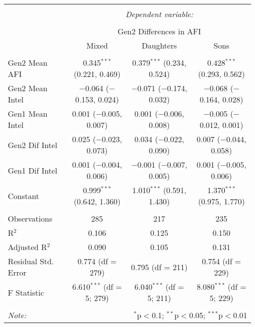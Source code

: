
\begingroup 
\small 
\begin{tabular}{@{\extracolsep{1pt}}lccc} 
\\[-1.8ex]\hline 
\hline \\[-1.8ex] 
 & \multicolumn{3}{c}{\textit{Dependent variable:}} \\ 
\cline{2-4} 
\\[-1.8ex] & \multicolumn{3}{c}{Gen2 Differences in AFI} \\ 
 & Mixed & Daughters & Sons \\ 
\hline \\[-1.8ex] 
 Gen2 Mean AFI & 0.345$^{***}$ (0.221, 0.469) & 0.379$^{***}$ (0.234, 0.524) & 0.428$^{***}$ (0.293, 0.562) \\ 
  Gen2 Mean Intel & $-$0.064 ($-$0.153, 0.024) & $-$0.071 ($-$0.174, 0.032) & $-$0.068 ($-$0.164, 0.028) \\ 
  Gen1 Mean Intel & 0.001 ($-$0.005, 0.007) & 0.001 ($-$0.006, 0.008) & $-$0.005 ($-$0.012, 0.001) \\ 
  Gen2 Dif Intel & 0.025 ($-$0.023, 0.073) & 0.034 ($-$0.022, 0.090) & 0.007 ($-$0.044, 0.058) \\ 
  Gen1 Dif Intel & 0.001 ($-$0.004, 0.006) & $-$0.001 ($-$0.007, 0.005) & 0.001 ($-$0.005, 0.006) \\ 
  Constant & 0.999$^{***}$ (0.642, 1.360) & 1.010$^{***}$ (0.591, 1.430) & 1.370$^{***}$ (0.975, 1.770) \\ 
 \hline \\[-1.8ex] 
Observations & 285 & 217 & 235 \\ 
R$^{2}$ & 0.106 & 0.125 & 0.150 \\ 
Adjusted R$^{2}$ & 0.090 & 0.105 & 0.131 \\ 
Residual Std. Error & 0.774 (df = 279) & 0.795 (df = 211) & 0.754 (df = 229) \\ 
F Statistic & 6.610$^{***}$ (df = 5; 279) & 6.040$^{***}$ (df = 5; 211) & 8.080$^{***}$ (df = 5; 229) \\ 
\hline 
\hline \\[-1.8ex] 
\textit{Note:}  & \multicolumn{3}{r}{$^{*}$p$<$0.1; $^{**}$p$<$0.05; $^{***}$p$<$0.01} \\ 
\end{tabular} 
\endgroup 
